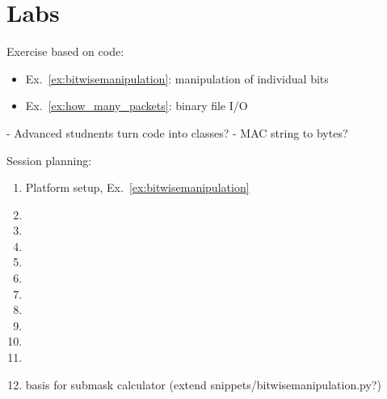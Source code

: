 \chapter{Labs}

Exercise based on code:
\begin{itemize}
 \item Ex.~\ref{ex:bitwisemanipulation}: manipulation of individual bits
 \item Ex.~\ref{ex:how_many_packets}: binary file I/O
\end{itemize}

- Advanced studnents turn code into classes?
- MAC string to bytes?

Session planning:
\begin{enumerate}

\item Platform setup, Ex.~\ref{ex:bitwisemanipulation}
\item 
\item
\item
\item
\item
\item
\item
\item
\item
\item
\item


basis for submask calculator (extend snippets/bitwisemanipulation.py?)
\end{enumerate}




